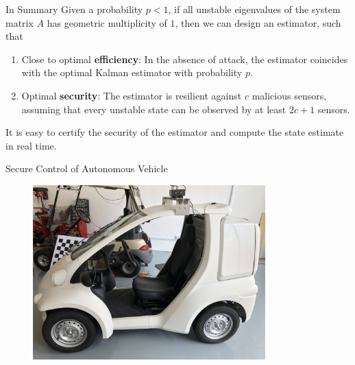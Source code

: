 \documentclass[10pt]{beamer}
\begin{document}
\begin{frame}{In Summary}
  Given a probability $p<1$, if all unstable eigenvalues of the system matrix $A$ has geometric multiplicity of $1$, then we can design an estimator, such that
  \begin{enumerate}
    \item Close to optimal {\bf efficiency}: In the absence of attack, the estimator coincides with the optimal Kalman estimator with probability $p$.
    \item Optimal {\bf security}: The estimator is resilient against $c$ malicious sensors, assuming that every unstable state can be observed by at least $2c+1$ sensors.
  \end{enumerate}
  It is easy to certify the security of the estimator and compute the state estimate in real time. 
\end{frame}

\begin{frame}{Secure Control of Autonomous Vehicle}
  \begin{figure}[ht]
    \centering
    \includegraphics[width=0.8\textwidth]{singpilot.jpg}
  \end{figure}

\end{frame}
\end{document}
